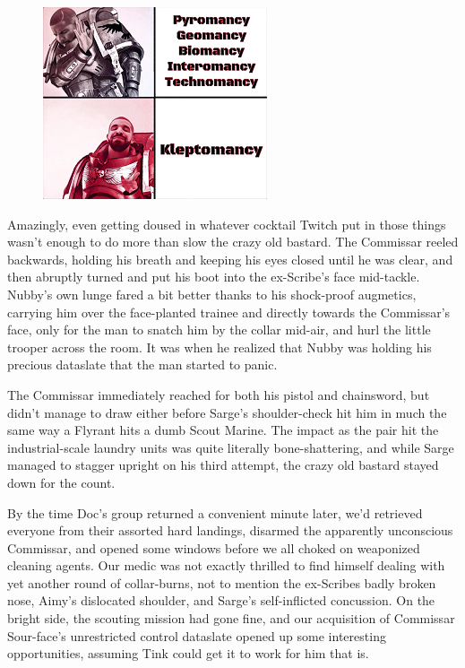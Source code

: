 \begin{figure}
	\begin{center}
		\includegraphics[width=\figwidth]{pics/21/65.png}
	\end{center}
\end{figure}
Amazingly, even getting doused in whatever cocktail Twitch put in those things wasn't enough to do more than slow the crazy old bastard. 
The Commissar reeled backwards, holding his breath and keeping his eyes closed until he was clear, and then abruptly turned and put his boot into the ex-Scribe's face mid-tackle. 
Nubby's own lunge fared a bit better thanks to his shock-proof augmetics, carrying him over the face-planted trainee and directly towards the Commissar's face, only for the man to snatch him by the collar mid-air, and hurl the little trooper across the room. 
It was when he realized that Nubby was holding his precious dataslate that the man started to panic.

The Commissar immediately reached for both his pistol and chainsword, but didn't manage to draw either before Sarge's shoulder-check hit him in much the same way a Flyrant hits a dumb Scout Marine. 
The impact as the pair hit the industrial-scale laundry units was quite literally bone-shattering, and while Sarge managed to stagger upright on his third attempt, the crazy old bastard stayed down for the count.

By the time Doc's group returned a convenient minute later, we'd retrieved everyone from their assorted hard landings, disarmed the apparently unconscious Commissar, and opened some windows before we all choked on weaponized cleaning agents. 
Our medic was not exactly thrilled to find himself dealing with yet another round of collar-burns, not to mention the ex-Scribes badly broken nose, Aimy's dislocated shoulder, and Sarge's self-inflicted concussion. 
On the bright side, the scouting mission had gone fine, and our acquisition of Commissar Sour-face's unrestricted control dataslate opened up some interesting opportunities, assuming Tink could get it to work for him that is.

